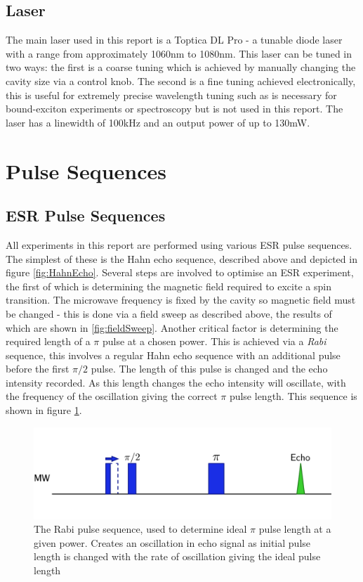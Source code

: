 \subsection{Laser}

The main laser used in this report is a Toptica DL Pro - a tunable diode laser with a range from approximately 1060nm to 1080nm.
This laser can be tuned in two ways: the first is a coarse tuning which is achieved by manually changing the cavity size via a control knob. 
The second is a fine tuning achieved electronically, this is useful for extremely precise wavelength tuning such as is necessary for bound-exciton experiments or spectroscopy but is not used in this report.
The laser has a linewidth of 100kHz and an output power of up to 130mW.

\section{Pulse Sequences}


\subsection{ESR Pulse Sequences}

All experiments in this report are performed using various ESR pulse sequences. 
The simplest of these is the Hahn echo sequence, described above and depicted in figure \ref{fig:HahnEcho}.
Several steps are involved to optimise an ESR experiment, the first of which is determining the magnetic field required to excite a spin transition. 
The microwave frequency is fixed by the cavity so magnetic field must be changed - this is done via a field sweep as described above, the results of which are shown in \ref{fig:fieldSweep}. 
Another critical factor is determining the required length of a $\pi$ pulse at a chosen power.
This is achieved via a \emph{Rabi} sequence, this involves a regular Hahn echo sequence with an additional pulse before the first $\pi/2$ pulse. 
The length of this pulse is changed and the echo intensity recorded. 
As this length changes the echo intensity will oscillate, with the frequency of the oscillation giving the correct $\pi$ pulse length.
This sequence is shown in figure \ref{fig:Rabi}.

\begin{figure}
\centering
\includegraphics[width = \columnwidth]{Figures/Rabi.pdf}
\caption[Rabi Sequence]{The Rabi pulse sequence, used to determine ideal $\pi$ pulse length at a given power. Creates an oscillation in echo signal as initial pulse length is changed with the rate of oscillation giving the ideal pulse length}
\label{fig:Rabi}
\end{figure}

